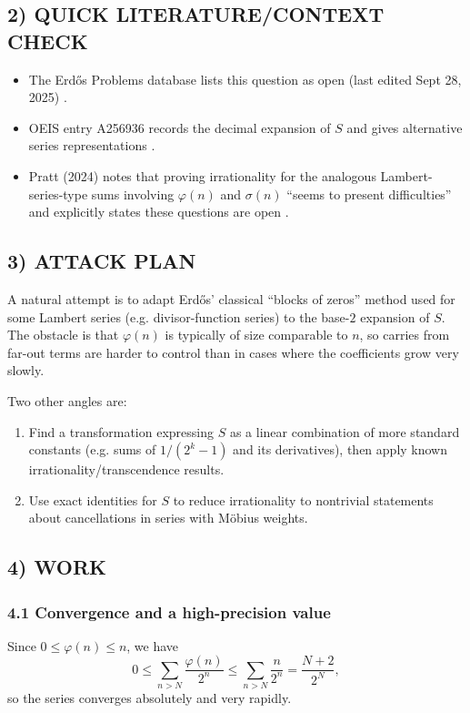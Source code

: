 \subsection*{2) QUICK LITERATURE/CONTEXT CHECK}
\begin{itemize}[leftmargin=2em]
\item The Erd\H{o}s Problems database lists this question as open (last edited Sept 28, 2025) \cite{ErdosProblems249}.
\item OEIS entry A256936 records the decimal expansion of $S$ and gives alternative series representations \cite{OEISA256936}.
\item Pratt (2024) notes that proving irrationality for the analogous Lambert-series-type sums involving $\varphi(n)$ and $\sigma(n)$ ``seems to present difficulties'' and explicitly states these questions are open \cite{Pratt2024}.
\end{itemize}

\subsection*{3) ATTACK PLAN}
A natural attempt is to adapt Erd\H{o}s' classical ``blocks of zeros'' method used for some Lambert series (e.g. divisor-function series) to the base-$2$ expansion of $S$. The obstacle is that $\varphi(n)$ is typically of size comparable to $n$, so carries from far-out terms are harder to control than in cases where the coefficients grow very slowly.

Two other angles are:
\begin{enumerate}[leftmargin=2em]
\item Find a transformation expressing $S$ as a linear combination of more standard constants (e.g. sums of $1/(2^k-1)$ and its derivatives), then apply known irrationality/transcendence results.
\item Use exact identities for $S$ to reduce irrationality to nontrivial statements about cancellations in series with M\"obius weights.
\end{enumerate}

\subsection*{4) WORK}
\subsubsection*{4.1 Convergence and a high-precision value}
Since $0\le \varphi(n)\le n$, we have
\[
0\le \sum_{n>N}\frac{\varphi(n)}{2^n} \le \sum_{n>N}\frac{n}{2^n} = \frac{N+2}{2^N},
\]
so the series converges absolutely and very rapidly.

